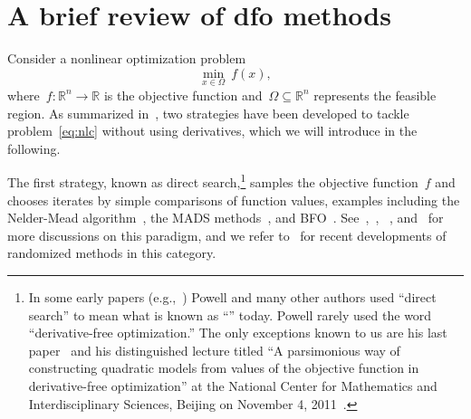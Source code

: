 \documentclass[
    smallextended,  %
    final,          %
]{svjour3}
\newcommand{\R}{\mathbb{R}}
\newcommand{\fset}{\Omega}
\newcommand{\obj}{f}
\begin{document}
\section{A brief review of \texorpdfstring{\gls{dfo}}{DFO} methods}
\label{sec:dfo}

Consider a nonlinear optimization problem
\begin{equation}
    \label{eq:nlc}
    \min_{x \in \fset} ~ \obj(x),
\end{equation}
where~$\obj : \R^n \to \R$ is the objective function and~$\fset \subseteq \R^n$ represents the feasible region.
As summarized in~\cite{Conn_Scheinberg_Vicente_2009b}, two strategies have been developed to tackle
problem~\eqref{eq:nlc} without using derivatives, which we will introduce in the following.

The first strategy, known as direct search,\footnote{In some early papers (e.g.,~\cite{Powell_1994,Powell_1998})
Powell and many other authors used ``direct search'' to mean what is known as ``'' today. Powell rarely used the word ``derivative-free optimization.''
The only exceptions known to us are his last paper~\cite{Powell_2015} and his distinguished lecture
titled ``A parsimonious way of constructing quadratic models from values of the objective function in
derivative-free optimization'' at the National Center for Mathematics and Interdisciplinary Sciences,
Beijing on November 4, 2011~\cite{Buhmann_Fletcher_Iserles_Toint_2018}.}
samples the objective function~$\obj$ and chooses iterates by simple comparisons of function values, examples including
the Nelder-Mead algorithm~\cite{Nelder_Mead_1965}, the MADS methods~\cite{Audet_Dennis_2006,LeDigabel_2011}, and BFO~\cite{Porcelli_Toint_2017,Porcelli_Toint_2020,Porcelli_Toint_2022}.
See~\cite{Kolda_Lewis_Torczon_2003},~\cite[Chapters~7 and~8]{Conn_Scheinberg_Vicente_2009b},
~\cite[Part~3]{Audet_Hare_2017}, and~\cite[\S~2.1]{Larson_Menickelly_Wild_2019} for more discussions
on this paradigm, and we refer to~\cite{Gratton_Etal_2015,Gratton_Etal_2019} for recent developments
of randomized methods in this category.
\end{document}
